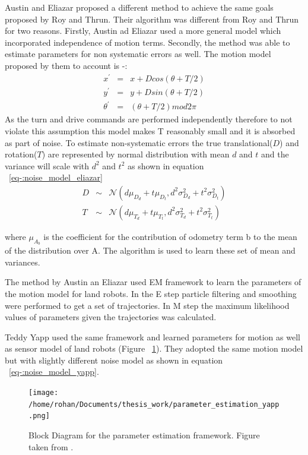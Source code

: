 \documentclass[12pt]{dalcsthesis}
\begin{document}
Austin and Eliazar \cite{Eliazar2004} proposed a different method to achieve the same goals proposed by Roy and Thrun. Their algorithm was different from Roy and Thrun for two reasons. Firstly, Austin ad Eliazar used a more general model which incorporated independence of motion terms. Secondly, the method was able to estimate parameters for non systematic errors as well. 
The motion model proposed by them to account is -:
\begin{equation}
	\begin{aligned}
	x^{'}&=&x+Dcos(\theta+T/2) \\
	y^{'}&=&y+Dsin(\theta+T/2) \\
	\theta^{'}&=&(\theta+T/2)mod2\pi
	\end{aligned}
\end{equation}
As the turn and drive commands are performed independently therefore to not violate this assumption this model makes T reasonably small and it is absorbed as part of noise. To estimate non-systematic errors the true translational($D$) and rotation($T$) are represented by normal distribution with mean $d$ and $t$ and the variance will scale with $d^2$ and $t^2$ as shown in equation ~\ref{eq-:noise_model_eliazar}
\begin{equation}
\label{eq-:noise_model_eliazar}
\begin{aligned}
D &\sim& \mathcal{{N}}(d\mu_{D_{d}}+t\mu_{D_{t}},d^2\sigma_{D_{d}}^2+t^2\sigma_{D_{t}}^2)\\
T &\sim& \mathcal{{N}}(d\mu_{T_{d}}+t\mu_{T_{t}},d^2\sigma_{T_{d}}^2+t^2\sigma_{T_{t}}^2)
\end{aligned}
\end{equation}

where $\mu_{A_{b}}$ is the coefficient for the contribution of odometry term b to the mean of the distribution over A. The algorithm is used to learn these set of mean and variances.

The method by Austin an Eliazar used EM framework to learn the parameters of the motion model for land robots. In the E step particle filtering and smoothing were performed to get a set of trajectories. In M step the maximum likelihood values of parameters given the trajectories was calculated.

Teddy Yapp \cite{Yap2008} used the same framework and learned parameters for motion as well as sensor model of land robots (Figure ~\ref{fig-parameter_estimation Yapp}). They adopted the same motion model but with slightly different noise model as shown in equation ~\ref{eq-:noise_model_yapp}.
\begin{figure}
  \centering
     {\texttt{[image: /home/rohan/Documents/thesis\_work/parameter\_estimation\_yapp.png]}}
  \caption{\label{fig-parameter_estimation Yapp} Block Diagram for the parameter estimation framework. Figure taken from \cite{Yap2008}.}
\end{figure}
\end{document}
